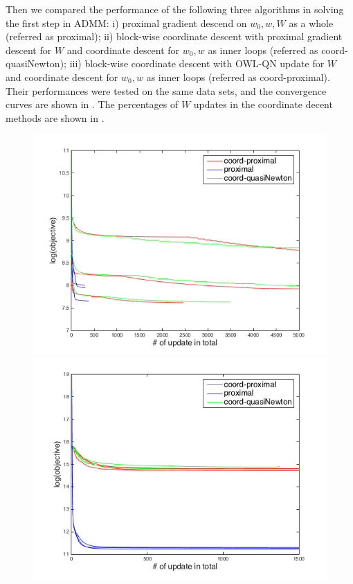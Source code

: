 \documentclass{article}
\begin{document}
Then we compared the performance of the following three algorithms in solving the first step in ADMM: i) proximal gradient descend on $w_0, w, W$ as a whole (referred as proximal); ii) block-wise coordinate descent with proximal gradient descent for $W$ and coordinate descent for $w_0, w$ as inner loops (referred as coord-quasiNewton); iii) block-wise coordinate descent with OWL-QN update for $W$ and coordinate descent for $w_0, w$ as inner loops (referred as coord-proximal). Their performances were tested on the same data sets, and the convergence curves are shown in . The percentages of $W$ updates in the coordinate decent methods are shown in . 
\begin{figure}[htbp]
  \centering
  \begin{minipage}{0.24\textwidth}
    \centering
    \includegraphics[width=1\textwidth]{../yanyu_code/plots/sym_w0wW_curve_p30}
  \end{minipage}
  \hfill
  \begin{minipage}{0.24\textwidth}
    \centering
    \includegraphics[width=1\textwidth]{../yanyu_code/plots/asym_w0wW_curve_p30}

\end{minipage}
\end{figure}
\end{document}
